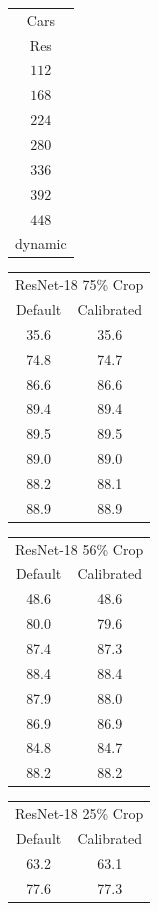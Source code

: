 \begin{table}
    \centering
    \begin{tabular}{c|}
    Cars \\
    Res \\
    \hline
    $112$ \\ 
    $168$ \\ 
    $224$ \\ 
    $280$ \\ 
    $336$ \\ 
    $392$ \\ 
    $448$ \\
    dynamic\\
    \end{tabular}
    \begin{tabular}{|c|c|}
    \multicolumn{2}{|c|}{ ResNet-18 75\% Crop}\\
    Default & Calibrated \\
    \hline
    35.6 & 35.6 \\
    74.8 & 74.7\\ 
    86.6 & 86.6\\ 
    89.4 & 89.4\\ 
    89.5 & 89.5\\ 
    89.0 & 89.0\\ 
    88.2 & 88.1\\
    88.9 & 88.9\\ 
    \end{tabular}
    \begin{tabular}{|c|c|}
    \multicolumn{2}{|c|}{ ResNet-18 56\% Crop}\\
    Default & Calibrated  \\
    \hline
    48.6 & 48.6 \\ 
    80.0 & {\color{red}79.6}\\ 
    87.4 & 87.3 \\ 
    88.4 & 88.4 \\ 
    87.9 & 88.0 \\ 
    86.9 & 86.9 \\ 
    84.8 & 84.7\\
    88.2& 88.2 \\ 
    \end{tabular}
    \begin{tabular}{|c|c|}
    \multicolumn{2}{|c|}{ ResNet-18 25\% Crop}\\
    Default & Calibrated  \\
    \hline
    63.2 & 63.1 \\ 
    77.6 & {\color{red}77.3}\\ 

\end{tabular}
\end{table}

